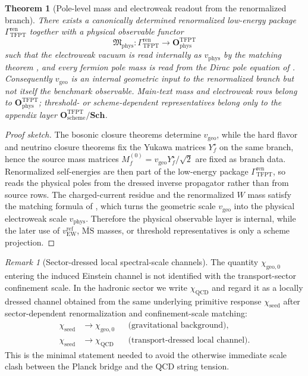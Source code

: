 \documentclass[11pt,a4paper]{article}
\newtheorem{theorem}{Theorem}[section]
\theoremstyle{definition}
\theoremstyle{remark}
\newtheorem*{remark}{Remark}
\newcommand{\QCD}{\mathrm{QCD}}
\newcommand{\chiseed}{\chi_{\mathrm{seed}}}
\newcommand{\chigeozero}{\chi_{\mathrm{geo},0}}
\newcommand{\vgeo}{v_{\mathrm{geo}}}
\newcommand{\vewref}{v_{\mathrm{EW}}^{\mathrm{ref}}}
\newcommand{\GrenTFPT}{\Gamma_{\mathrm{TFPT}}^{\mathrm{ren}}}
\newcommand{\OphysTFPT}{\mathbf O_{\mathrm{phys}}^{\mathrm{TFPT}}}
\newcommand{\OschemeTFPT}{\mathbf O_{\mathrm{scheme}}^{\mathrm{TFPT}}}
\newcommand{\SchGrp}{\mathbf{Sch}}
\newcommand{\Mphys}{\mathfrak M_{\mathrm{phys}}}
\begin{document}
\begin{theorem}[Pole-level mass and electroweak readout from the renormalized branch]
\label{thm:pole-level-readout}
There exists a canonically determined renormalized low-energy package $\GrenTFPT$ together with a
physical observable functor
\[
\Mphys:\GrenTFPT\to\OphysTFPT
\]
such that the electroweak vacuum is read internally as $v_{\mathrm{phys}}$ by the matching theorem
, and every fermion pole mass is read from the Dirac
pole equation of .
Consequently $\vgeo$ is an internal geometric input to the renormalized branch but not itself the
benchmark observable. Main-text mass and electroweak rows belong to $\OphysTFPT$; threshold- or
scheme-dependent representatives belong only to the appendix layer $\OschemeTFPT/\SchGrp$.
\end{theorem}

\begin{proof}[Proof sketch]
The bosonic closure theorems determine $\vgeo$, while the hard flavor and neutrino closure theorems
fix the Yukawa matrices $Y_f^\star$ on the same branch, hence the source mass matrices
$M_f^{(0)}=\vgeo Y_f^\star/\sqrt2$ are fixed as branch data. Renormalized self-energies are then
part of the low-energy package $\GrenTFPT$, so  reads the physical
poles from the dressed inverse propagator rather than from source rows. The charged-current residue
and the renormalized $W$ mass satisfy the matching formula of
, which turns the geometric scale $\vgeo$ into the
physical electroweak scale $v_{\mathrm{phys}}$. Therefore the physical observable layer is
internal, while the later use of $\vewref$, $\overline{\mathrm{MS}}$ masses, or threshold
representatives is only a scheme projection.
\end{proof}

\begin{remark}[Sector-dressed local spectral-scale channels]
The quantity $\chigeozero$ entering the induced Einstein channel is not identified with the transport-sector confinement scale. In the hadronic sector we write $\chi_{\QCD}$ and regard it as a locally dressed channel obtained from the same underlying primitive response $\chiseed$ after sector-dependent renormalization and confinement-scale matching:
\[
\begin{aligned}
\chiseed &\longrightarrow \chigeozero
&& \text{(gravitational background)},
\\
\chiseed &\longrightarrow \chi_{\QCD}
&& \text{(transport-dressed local channel)}.
\end{aligned}
\]
This is the minimal statement needed to avoid the otherwise immediate scale clash between the Planck bridge and the QCD string tension.
\end{remark}
\end{document}
